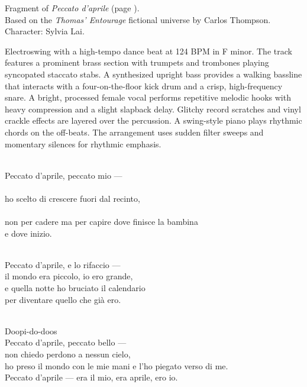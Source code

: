 

\begin{notes}
Fragment of \emph{Peccato d'aprile} (page \pageref{sec:peccato-daprile}).\\
Based on the \emph{Thomas’ Entourage} fictional universe by Carlos Thompson.\\
Character: Sylvia Lai.\\
\end{notes}

\begin{style}
Electroswing with a high-tempo dance beat at 124 BPM in F minor. %
The track features a prominent brass section with trumpets and trombones playing syncopated staccato stabs. %
A synthesized upright bass provides a walking bassline that interacts with a four-on-the-floor kick drum and a crisp, high-frequency snare. %
A bright, processed female vocal performs repetitive melodic hooks with heavy compression and a slight slapback delay. %
Glitchy record scratches and vinyl crackle effects are layered over the percussion. %
A swing-style piano plays rhythmic chords on the off-beats. %
The arrangement uses sudden filter sweeps and momentary silences for rhythmic emphasis.
\end{style}

\begin{lyrics}

\\
Peccato d’aprile, peccato mio —\\
\\
ho scelto di crescere fuori dal recinto,\\
\\
non per cadere ma per capire dove finisce la bambina\\
e dove inizio.

\\
Peccato d’aprile, e lo rifaccio —\\
il mondo era piccolo, io ero grande,\\
e quella notte ho bruciato il calendario\\
per diventare quello che già ero.

\\
Doopi-do-doos\\
Peccato d’aprile, peccato bello —\\
non chiedo perdono a nessun cielo,\\
ho preso il mondo con le mie mani e l’ho piegato verso di me.\\
Peccato d’aprile — era il mio, era aprile, ero io.

\end{lyrics}

